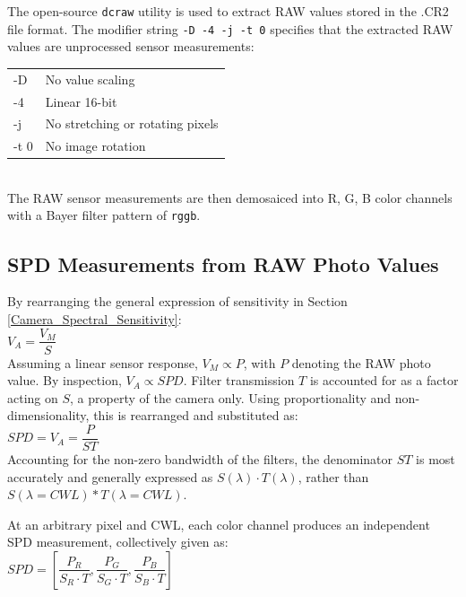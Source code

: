 \documentclass[twocolumn,10pt]{asme2ej}
\newcommand{\id}{\hspace{6 mm}}
\begin{document}
The open-source \texttt{dcraw} utility is used to extract RAW values stored in the .CR2 file format. The modifier string \texttt{-D -4 -j -t 0} specifies that the extracted RAW values are unprocessed sensor measurements:\\

\begin{tabular}{l | l}
-D & No value scaling \\
-4 & Linear 16-bit \\
-j & No stretching or rotating pixels \\
-t 0 & No image rotation \\
\end{tabular} \\

The RAW sensor measurements are then demosaiced into R, G, B color channels with a Bayer filter pattern of \texttt{rggb}.

\subsection{SPD Measurements from RAW Photo Values}

 By rearranging the general expression of sensitivity in Section \ref{Camera_Spectral_Sensitivity}: \\

 $V_A = \dfrac{V_M}{S}$ \\

Assuming a linear sensor response, $V_M \propto P$, with $P$ denoting the RAW photo value. By inspection, $V_A \propto SPD$. Filter transmission $T$ is accounted for as a factor acting on $S$, a property of the camera only. Using proportionality and non-dimensionality, this is rearranged and substituted as: \\

 $SPD = V_A = \dfrac{P}{ST}$ \\

Accounting for the non-zero bandwidth of the filters, the denominator $ST$ is most accurately and generally expressed as $S(\lambda) \cdot T(\lambda)$, rather than $S(\lambda=CWL)*T(\lambda=CWL)$.

\id At an arbitrary pixel and CWL, each color channel produces an independent SPD measurement, collectively given as: \\

 $SPD = \left[ \dfrac{P_R}{S_R \cdot T},\dfrac{P_G}{S_G \cdot T},\dfrac{P_B}{S_B \cdot T} \right] $ \\
\end{document}
